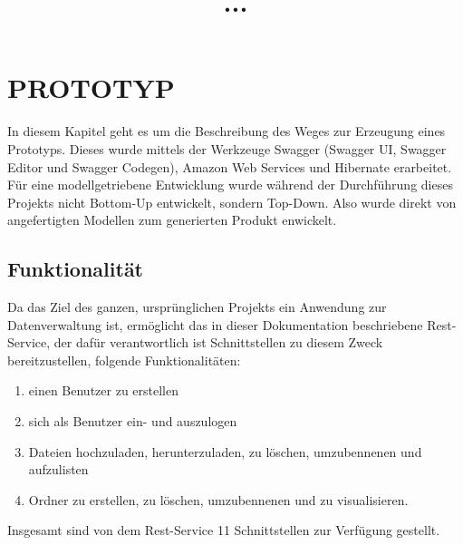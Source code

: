 \documentclass[a4paper,twoside]{article}
\begin{document}
	
	\title{\uppercase{...}}
	
	\author{
	}
	
	
	
	\onecolumn \maketitle \normalsize \vfill
	
	\section{\uppercase{Prototyp}}
	
	In diesem Kapitel geht es um die Beschreibung des Weges zur Erzeugung eines Prototyps. Dieses wurde mittels der Werkzeuge Swagger \cite{swagger} (Swagger UI, Swagger Editor und Swagger Codegen), Amazon Web Services und Hibernate erarbeitet. F\"ur eine modellgetriebene Entwicklung wurde w\"ahrend der Durchf\"uhrung dieses Projekts nicht Bottom-Up entwickelt, sondern Top-Down. Also wurde direkt von angefertigten Modellen zum generierten Produkt enwickelt.
	
	\subsection{Funktionalit\"at}
	
	Da das Ziel des ganzen, urspr\"unglichen Projekts ein Anwendung zur Datenverwaltung ist, erm\"oglicht das in dieser Dokumentation beschriebene Rest-Service, der daf\"ur verantwortlich ist Schnittstellen zu diesem Zweck bereitzustellen, folgende Funktionalit\"aten:
	\begin{enumerate}
		\item einen Benutzer zu erstellen
		\item sich als Benutzer ein- und auszulogen
		\item Dateien hochzuladen, herunterzuladen, zu l\"oschen, umzubennenen und aufzulisten
		\item Ordner zu erstellen, zu l\"oschen, umzubennenen und zu visualisieren.
	\end{enumerate}
	
	Insgesamt sind von dem Rest-Service 11 Schnittstellen zur Verf\"ugung gestellt.
	
\end{document}
